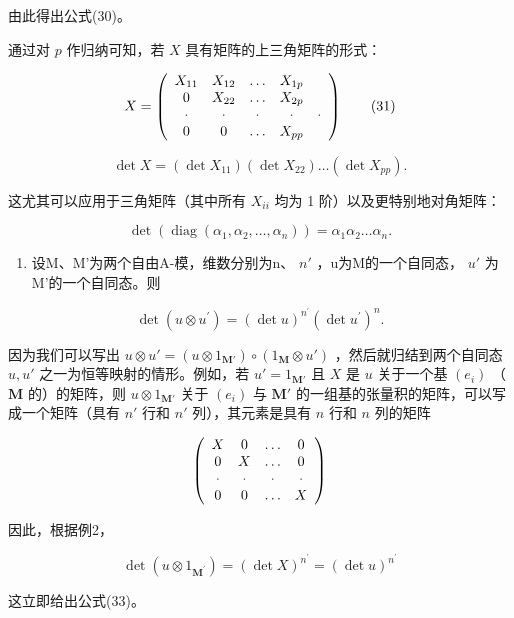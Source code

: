 由此得出公式(30)。

通过对 \(p\) 作归纳可知，若 \(X\) 具有矩阵的上三角矩阵的形式：

\[
X = \left( \begin{array}{c c c c c} X _ {1 1} & X _ {1 2} & \ldots & X _ {1 p} \\ 0 & X _ {2 2} & \ldots & X _ {2 p} \\ \cdot & \cdot & \cdot & \cdot & \cdot \\ 0 & 0 & \ldots & X _ {p p} \end{array} \right)\tag{31}
\]

\[
\det X = (\det X _ {1 1}) (\det X _ {2 2}) \dots (\det X _ {p p}).
\]

这尤其可以应用于三角矩阵（其中所有 \(X_{ii}\) 均为 1 阶）以及更特别地对角矩阵：

\[
\det (\operatorname{diag} \left(\alpha_ {1}, \alpha_ {2}, \dots , \alpha_ {n}\right)) = \alpha_ {1} \alpha_ {2} \dots \alpha_ {n}.\tag{32}
\]

\begin{enumerate}
\def\labelenumi{(\arabic{enumi})}
\setcounter{enumi}{2}
\tightlist
\item
  设M、M'为两个自由A-模，维数分别为n、 \(n'\) ，u为M的一个自同态， \(u'\) 为M'的一个自同态。则
\end{enumerate}

\[
\det (u \otimes u ^ {\prime}) = (\det u) ^ {n ^ {\prime}} (\det u ^ {\prime}) ^ {n}.\tag{33}
\]

因为我们可以写出 \(u \otimes u' = (u \otimes 1_{\mathbf{M}'}) \circ (1_{\mathbf{M}} \otimes u')\) ，然后就归结到两个自同态 \(u, u'\) 之一为恒等映射的情形。例如，若 \(u' = 1_{\mathbf{M}'}\) 且 \(X\) 是 \(u\) 关于一个基 \((e_i)\) （ \(\mathbf{M}\) 的）的矩阵，则 \(u \otimes 1_{\mathbf{M}'}\) 关于 \((e_i)\) 与 \(\mathbf{M}'\) 的一组基的张量积的矩阵，可以写成一个矩阵（具有 \(n'\) 行和 \(n'\) 列），其元素是具有 \(n\) 行和 \(n\) 列的矩阵

\[
\left( \begin{array}{c c c c} X & 0 & \ldots & 0 \\ 0 & X & \ldots & 0 \\ \cdot & \cdot & \cdot & \cdot \\ 0 & 0 & \ldots & X \end{array} \right)
\]

因此，根据例2，

\[
\det (u \otimes 1 _ {\mathbf {M} ^ {\prime}}) = (\det X) ^ {n ^ {\prime}} = (\det u) ^ {n ^ {\prime}}
\]

这立即给出公式(33)。

